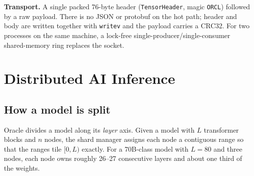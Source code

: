 \documentclass[11pt,a4paper]{article}
\begin{document}
\textbf{Transport.} A single packed 76-byte header (\texttt{TensorHeader},
magic \texttt{ORCL}) followed by a raw payload. There is no JSON or protobuf on
the hot path; header and body are written together with \texttt{writev} and the
payload carries a CRC32. For two processes on the same machine, a lock-free
single-producer/single-consumer shared-memory ring replaces the socket.

\section{Distributed AI Inference}

\subsection{How a model is split}

Oracle divides a model along its \emph{layer} axis. Given a model with $L$
transformer blocks and $n$ nodes, the shard manager assigns each node a
contiguous range so that the ranges tile $[0,L)$ exactly. For a 70B-class model
with $L=80$ and three nodes, each node owns roughly 26--27 consecutive layers
and about one third of the weights.
\end{document}
